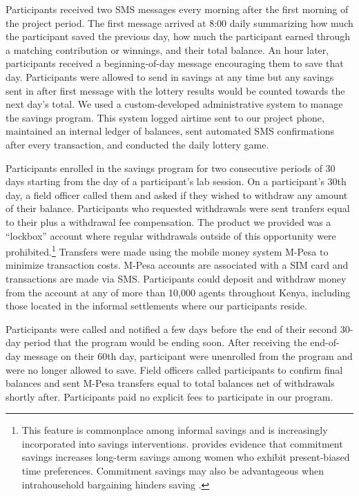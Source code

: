 \documentclass[11pt]{article}
\begin{document}
		Participants received two SMS messages every morning after the first morning of the project period. The first message arrived at 8:00 daily summarizing how much the participant saved the previous day, how much the participant earned through a matching contribution or winnings, and their total balance. An hour later, participants received a beginning-of-day message encouraging them to save that day. Participants were allowed to send in savings at any time but any savings sent in after first message with the lottery results would be counted towards the next day's total. We used a custom-developed administrative system to manage the savings program. This system logged airtime sent to our project phone, maintained an internal ledger of balances, sent automated SMS confirmations after every transaction, and conducted the daily lottery game.

		Participants enrolled in the savings program for two consecutive periods of 30 days starting from the day of a participant's lab session. On a participant's 30th day, a field officer called them and asked if they wished to withdraw any amount of their balance. Participants who requested withdrawals were sent tranfers equal to their plus a withdrawal fee compensation. The product we provided was a ``lockbox'' account where regular withdrawals outside of this opportunity were prohibited.\footnote{This feature is commonplace among informal savings and is increasingly incorporated into savings interventions. \textcite{ashraf_tying_2006} provides evidence that commitment savings increases long-term savings among women who exhibit present-biased time preferences. Commitment savings may also be advantageous when intrahousehold bargaining hinders saving \parencite{banerjee_economic_2007,schaner_cost_2011}.} Transfers were made using the mobile money system M-Pesa to minimize transaction costs. M-Pesa accounts are associated with a SIM card and transactions are made via SMS. Participants could deposit and withdraw money from the account at any of more than 10,000 agents throughout Kenya, including those located in the informal settlements where our participants reside.

		Participants were called and notified a few days before the end of their second 30-day period that the program would be ending soon. After receiving the end-of-day message on their 60th day, participant were unenrolled from the program and were no longer allowed to save. Field officers called participants to confirm final balances and sent M-Pesa transfers equal to total balances net of withdrawals shortly after. Participants paid no explicit fees to participate in our program.
\end{document}
